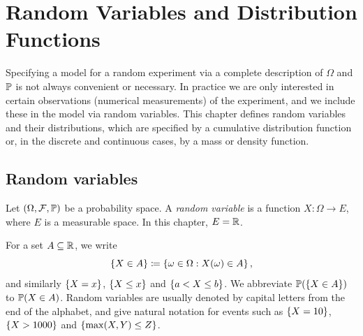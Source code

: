 \chapter{Random Variables and Distribution Functions}\label{ch:random-variables}



Specifying a model for a random experiment via a complete description of $\Omega$ and $\mathbb{P}$ is not always convenient or necessary. In practice we are only interested in certain observations (numerical measurements) of the experiment, and we include these in the model via random variables. This chapter defines random variables and their distributions, which are specified by a cumulative distribution function or, in the discrete and continuous cases, by a mass or density function.

\section{Random variables}\label{sec:random-variables}

\begin{definition}\label{def:random-variable}
Let $(\Omega, \mathcal{F}, \mathbb{P})$ be a probability space. A \emph{random variable} is a function $X \colon \Omega \to E$, where $E$ is a measurable space. In this chapter, $E = \mathbb{R}$.
\end{definition}

For a set $A \subseteq \mathbb{R}$, we write
\[
  \left\{ X \in A \right\} \coloneqq \left\{ \omega \in \Omega : X(\omega) \in A \right\},
\]
and similarly $\left\{ X = x \right\}$, $\left\{ X \le x \right\}$ and $\left\{ a < X \le b \right\}$. We abbreviate $\mathbb{P}(\left\{ X \in A \right\})$ to $\mathbb{P}(X \in A)$. Random variables are usually denoted by capital letters from the end of the alphabet, and give natural notation for events such as $\left\{ X = 10 \right\}$, $\left\{ X > 1000 \right\}$ and $\left\{ \max(X, Y) \le Z \right\}$.

